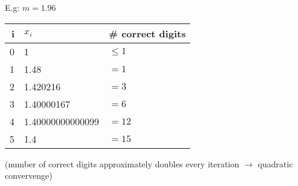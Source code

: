 E.g: $m=1.96$
\begin{center}
    \begin{tabular}{r l l}
        \toprule
        i & $x_i$              & \# correct digits \\
        \midrule
        0 & 1                & $\leq 1$          \\
        1 & 1.48             & $=1$              \\
        2 & 1.420216         & $=3$              \\
        3 & 1.40000167       & $=6$              \\
        4 & 1.40000000000099 & $=12$             \\
        5 & 1.4              & $=15$             \\
        \bottomrule
    \end{tabular}
\end{center}
(number of correct digits approximately doubles every iteration $\to$ quadratic convervenge)
